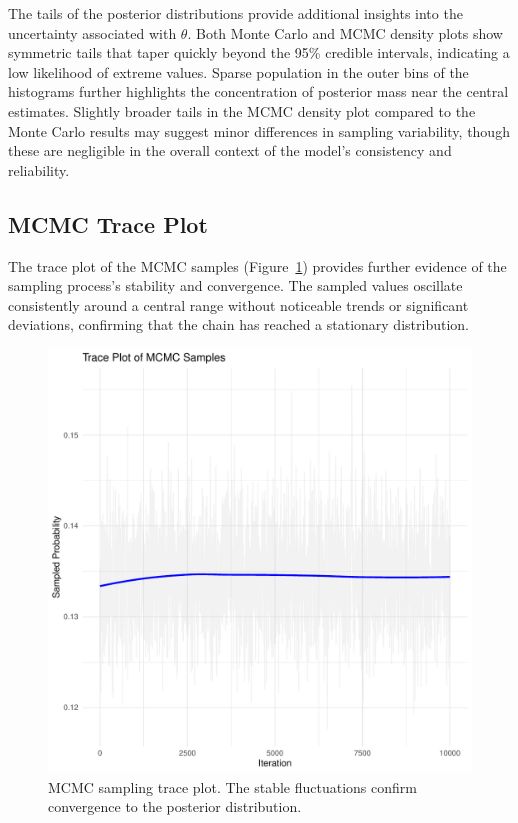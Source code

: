 \documentclass[12pt,a4paper]{article}
\begin{document}
The tails of the posterior distributions provide additional insights into the uncertainty associated with
$\theta$. Both Monte Carlo and MCMC density plots show symmetric tails that taper quickly beyond the 95\%
credible intervals, indicating a low likelihood of extreme values. Sparse population in the outer bins of
the histograms further highlights the concentration of posterior mass near the central estimates. Slightly
broader tails in the MCMC density plot compared to the Monte Carlo results may suggest minor differences in
sampling variability, though these are negligible in the overall context of the model's consistency and
reliability.

\subsection{MCMC Trace Plot}\label{ssec:traceplot}

The trace plot of the MCMC samples (Figure~\ref{fig:mcmctraceplot}) provides further evidence of the sampling
process's stability and convergence. The sampled values oscillate consistently around a central range without
noticeable trends or significant deviations, confirming that the chain has reached a stationary distribution.

\newpage

\begin{figure}[!ht]
    \centering
    \begin{minipage}[ht]{0.6\textwidth}
        \includegraphics[width=\textwidth]{figures/mcmc_trace_plot.pdf}
    \end{minipage}%
    \hspace{0.02\textwidth}
    \begin{minipage}[ht]{0.35\textwidth}
        \caption{MCMC sampling trace plot. The stable fluctuations confirm convergence to the posterior distribution.}
        \label{fig:mcmctraceplot}
    \end{minipage}
\end{figure}
\end{document}
